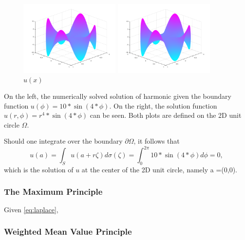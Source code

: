\begin{figure}[h]
  \centering
  \begin{minipage}[b]{0.4\textwidth}
  \includegraphics[width=5cm]{styles/sinBoundarysovle.png}
  \caption{$u_{sol}(x)$}%
  \label{fig:swingSolve}
\end{minipage}
  \begin{minipage}[b]{0.4\textwidth}
  \includegraphics[width=5cm]{styles/swing_function_plot.png}
  \caption{$u(x)$}%
  \label{fig:swingPlot}
  \end{minipage}
\end{figure}

On the left, the numerically solved solution of harmonic  given the boundary
function $u(\phi)=10*\sin(4*\phi)$.  On the right, the solution function $u(r,\phi)=r^{4}*\sin(4*\phi)$
can be seen. Both plots are defined on the 2D unit circle $\Omega$.

Should one integrate over the
boundary $\partial \Omega$, it follows that \begin{equation}
u(a) = \int_{S}u(a + r\zeta)d\sigma(\zeta) = \int_{0}^{2\pi} 10*\sin(4*\phi)d\phi = 0,
\end{equation}
which is the solution of $u$ at the center of the 2D unit circle,
namely a =(0,0).
  \subsubsection{The Maximum Principle}\label{sssec:maximum}
  Given \ref{eq:laplace},
  \subsubsection{Weighted Mean Value Principle}

